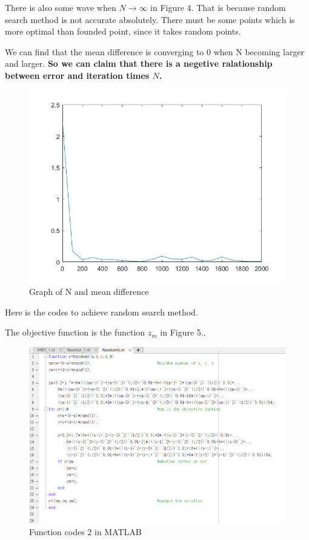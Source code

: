 \documentclass{report}
\begin{document}
\par There is also some wave when $N\to \infty $ in Figure 4. 
That is because random search method is not accurate absolutely. 
There must be some points which is more optimal than founded point, since it takes random points. 

\par We can find that the mean difference is converging to 0 when N becoming larger and larger. 
{\bf So we can claim that there is a negetive ralationship between error and iteration times $N$.}

\begin{figure}[htbp]
    \centering
    \includegraphics[scale=0.3]{figs/2_3.jpg}
    \caption{Graph of N and mean difference}
\end{figure}

\par Here is the codes to achieve random search method. 
\par The objective function is the function $z_m$ in {Figure 5.}.


\begin{figure}[htbp]
    \centering
    \includegraphics[scale=0.6]{figs/2_2.jpg}
    \caption{Function codes 2 in MATLAB}
\end{figure}
\end{document}
